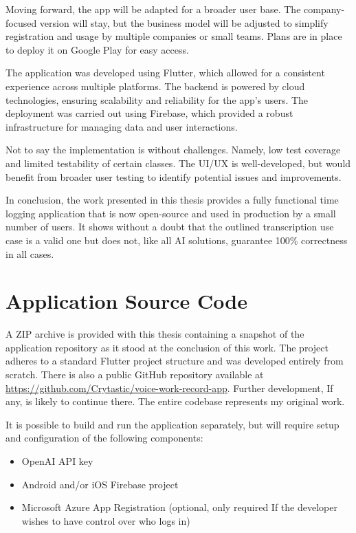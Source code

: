 \documentclass[
  digital,     %
  oneside,     %
  nosansbold,  %
  nocolorbold, %
  lof,         %
  lot,         %
]{fithesis4}
\begin{document}
Moving forward, the app will be adapted for a broader user base. The company-focused version will stay, but the business model will be adjusted to simplify registration and usage by multiple companies or small teams. Plans are in place to deploy it on Google Play for easy access.

The application was developed using Flutter, which allowed for a consistent experience across multiple platforms. The backend is powered by cloud technologies, ensuring scalability and reliability for the app’s users. The deployment was carried out using Firebase, which provided a robust infrastructure for managing data and user interactions.

Not to say the implementation is without challenges. Namely, low test coverage and limited testability of certain classes. The \gls{UI}/\gls{UX} is well-developed, but would benefit from broader user testing to identify potential issues and improvements.

In conclusion, the work presented in this thesis provides a fully functional time logging application that is now open-source and used in production by a small number of users. It shows without a doubt that the outlined transcription use case is a valid one but does not, like all \gls{AI} solutions, guarantee 100\% correctness in all cases.

\shorthandon{-}

\appendix %
\chapter{Application Source Code}
A ZIP archive is provided with this thesis containing a snapshot of the application repository as it stood at the conclusion of this work. The project adheres to a standard Flutter project structure and was developed entirely from scratch. There is also a public GitHub repository available at \url{https://github.com/Crytastic/voice-work-record-app}. Further development, If any, is likely to continue there. The entire codebase represents my original work.

It is possible to build and run the application separately, but will require setup and configuration of the following components:
\begin{itemize}
  \item OpenAI \gls{API} key
  \item Android and/or \gls{iOS} Firebase project
  \item Microsoft Azure App Registration (optional, only required If the developer wishes to have control over who logs in)
\end{itemize}
\end{document}
